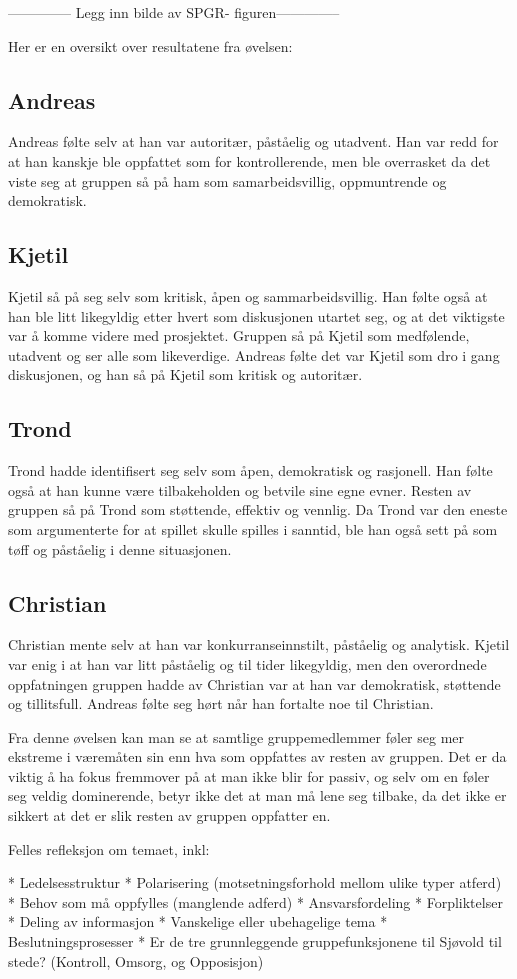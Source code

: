 -------------- Legg inn bilde av SPGR- figuren--------------

Her er en oversikt over resultatene fra øvelsen:

	\subsection{Andreas}
	Andreas følte selv at han var autoritær, påståelig og utadvent. Han var redd for at han kanskje ble oppfattet som for kontrollerende, men ble overrasket da det viste seg at gruppen så på ham som samarbeidsvillig, oppmuntrende og demokratisk. 

	\subsection{Kjetil}
	Kjetil så på seg selv som kritisk, åpen og sammarbeidsvillig. Han følte også at han ble litt likegyldig etter hvert som diskusjonen utartet seg, og at det viktigste var å komme videre med prosjektet. Gruppen så på Kjetil som medfølende, utadvent og ser alle som likeverdige. Andreas følte det var Kjetil som dro i gang diskusjonen, og han så på Kjetil som kritisk og autoritær.

	\subsection{Trond}
	Trond hadde identifisert seg selv som åpen, demokratisk og rasjonell. Han følte også at han kunne være tilbakeholden og betvile sine egne evner. Resten av gruppen så på Trond som støttende, effektiv og vennlig. Da Trond var den eneste som argumenterte for at spillet skulle spilles i sanntid, ble han også sett på som tøff og påståelig i denne situasjonen. 

	\subsection{Christian}
	Christian mente selv at han var konkurranseinnstilt, påståelig og analytisk. Kjetil var enig i at han var litt påståelig og til tider likegyldig, men den overordnede oppfatningen gruppen hadde av Christian var at han var demokratisk, støttende og tillitsfull. Andreas følte seg hørt når han fortalte noe til Christian.


Fra denne øvelsen kan man se at samtlige gruppemedlemmer føler seg mer ekstreme i væremåten sin enn hva som oppfattes av resten av gruppen. Det er da viktig å ha fokus fremmover på at man ikke blir for passiv, og selv om en føler seg veldig dominerende, betyr ikke det at man må lene seg tilbake, da det ikke er sikkert at det er slik resten av gruppen oppfatter en.  


Felles refleksjon om temaet, inkl:

	* Ledelsesstruktur
	* Polarisering (motsetningsforhold mellom ulike typer atferd)
	* Behov som må oppfylles (manglende adferd)
	* Ansvarsfordeling
	* Forpliktelser
	* Deling av informasjon
	* Vanskelige eller ubehagelige tema
	* Beslutningsprosesser
	* Er de tre grunnleggende gruppefunksjonene til Sjøvold til stede? (Kontroll, Omsorg, og Opposisjon)
